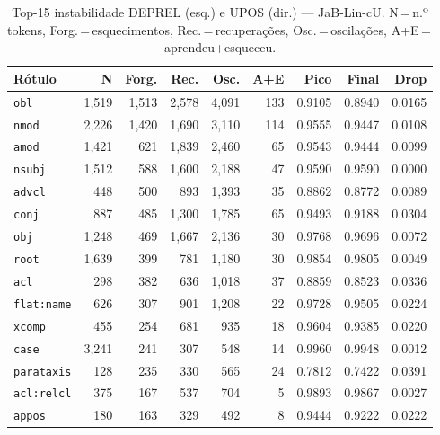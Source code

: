 

\begin{table}[ht]
\centering
\caption{Top-15 instabilidade DEPREL (esq.) e UPOS (dir.) --- JaB-Lin-cU. N\,=\,n.º tokens, Forg.\,=\,esquecimentos, Rec.\,=\,recuperações, Osc.\,=\,oscilações, A+E\,=\,aprendeu+esqueceu.}
\label{tab:inst-predictions-results-jabuticabert-linear}
\begin{minipage}[t]{0.54\linewidth}
\centering\tiny
\begin{tabular}{lrrrrrrrr}
\toprule
\textbf{Rótulo} & \textbf{N} & \textbf{Forg.} & \textbf{Rec.} & \textbf{Osc.} & \textbf{A+E} & \textbf{Pico} & \textbf{Final} & \textbf{Drop} \\
\midrule
\texttt{obl} & 1,519 & 1,513 & 2,578 & 4,091 & 133 & 0.9105 & 0.8940 & 0.0165 \\
\texttt{nmod} & 2,226 & 1,420 & 1,690 & 3,110 & 114 & 0.9555 & 0.9447 & 0.0108 \\
\texttt{amod} & 1,421 & 621 & 1,839 & 2,460 & 65 & 0.9543 & 0.9444 & 0.0099 \\
\texttt{nsubj} & 1,512 & 588 & 1,600 & 2,188 & 47 & 0.9590 & 0.9590 & 0.0000 \\
\texttt{advcl} & 448 & 500 & 893 & 1,393 & 35 & 0.8862 & 0.8772 & 0.0089 \\
\texttt{conj} & 887 & 485 & 1,300 & 1,785 & 65 & 0.9493 & 0.9188 & 0.0304 \\
\texttt{obj} & 1,248 & 469 & 1,667 & 2,136 & 30 & 0.9768 & 0.9696 & 0.0072 \\
\texttt{root} & 1,639 & 399 & 781 & 1,180 & 30 & 0.9854 & 0.9805 & 0.0049 \\
\texttt{acl} & 298 & 382 & 636 & 1,018 & 37 & 0.8859 & 0.8523 & 0.0336 \\
\texttt{flat\!:\!name} & 626 & 307 & 901 & 1,208 & 22 & 0.9728 & 0.9505 & 0.0224 \\
\texttt{xcomp} & 455 & 254 & 681 & 935 & 18 & 0.9604 & 0.9385 & 0.0220 \\
\texttt{case} & 3,241 & 241 & 307 & 548 & 14 & 0.9960 & 0.9948 & 0.0012 \\
\texttt{parataxis} & 128 & 235 & 330 & 565 & 24 & 0.7812 & 0.7422 & 0.0391 \\
\texttt{acl\!:\!relcl} & 375 & 167 & 537 & 704 & 5 & 0.9893 & 0.9867 & 0.0027 \\
\texttt{appos} & 180 & 163 & 329 & 492 & 8 & 0.9444 & 0.9222 & 0.0222 \\
\bottomrule
\end{tabular}

\end{minipage}
\end{table}
